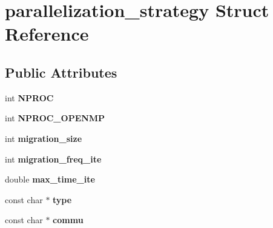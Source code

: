 \hypertarget{structparallelization__strategy}{\section{parallelization\-\_\-strategy Struct Reference}
\label{structparallelization__strategy}
}
\subsection*{Public Attributes}
\begin{DoxyCompactItemize}
\item 
\hypertarget{structparallelization__strategy_aa8d48b2d177b4a8721eb6b6ef39df994}{int {\bfseries N\-P\-R\-O\-C}}\label{structparallelization__strategy_aa8d48b2d177b4a8721eb6b6ef39df994}

\item 
\hypertarget{structparallelization__strategy_ad1149534276136ae4b3c2a53aa165e0f}{int {\bfseries N\-P\-R\-O\-C\-\_\-\-O\-P\-E\-N\-M\-P}}\label{structparallelization__strategy_ad1149534276136ae4b3c2a53aa165e0f}

\item 
\hypertarget{structparallelization__strategy_af4b84a41324e0394be6db0d77c8dfc7e}{int {\bfseries migration\-\_\-size}}\label{structparallelization__strategy_af4b84a41324e0394be6db0d77c8dfc7e}

\item 
\hypertarget{structparallelization__strategy_aa009b4f28d7435739c64c2d73e338293}{int {\bfseries migration\-\_\-freq\-\_\-ite}}\label{structparallelization__strategy_aa009b4f28d7435739c64c2d73e338293}

\item 
\hypertarget{structparallelization__strategy_ad8df60e98a61fc02daa33b12100ce7d8}{double {\bfseries max\-\_\-time\-\_\-ite}}\label{structparallelization__strategy_ad8df60e98a61fc02daa33b12100ce7d8}

\item 
\hypertarget{structparallelization__strategy_a0ebf147ee3a5e93b68caee9f9e57e725}{const char $\ast$ {\bfseries type}}\label{structparallelization__strategy_a0ebf147ee3a5e93b68caee9f9e57e725}

\item 
\hypertarget{structparallelization__strategy_a4facb28311f3581be1ec2640acad86bd}{const char $\ast$ {\bfseries commu}}\label{structparallelization__strategy_a4facb28311f3581be1ec2640acad86bd}


\end{DoxyCompactItemize}
